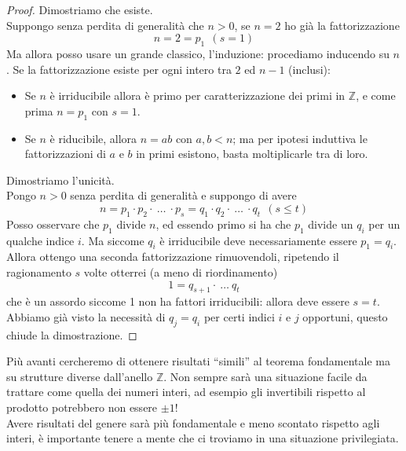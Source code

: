 \begin{proof} Dimostriamo che esiste. \\ Suppongo senza perdita di generalità che $n>0$, se $n=2$ ho già la fattorizzazione
	\begin{equation*}
	n = 2 = p_1 \ \ (s=1)
	\end{equation*}
	Ma allora posso usare un grande classico, l'induzione: procediamo inducendo su $n$. Se la fattorizzazione esiste per ogni intero tra $2$ ed $n-1$ (inclusi):
	\begin{itemize}
		\item Se $n$ è irriducibile allora è primo per caratterizzazione dei primi in $\mathbb{Z}$, e come prima $n=p_1$ con $s=1$.
		\item Se $n$ è riducibile, allora $n=ab$ con $a,b<n$; ma per ipotesi induttiva le fattorizzazioni di $a$ e $b$ in primi esistono, basta moltiplicarle tra di loro.
	\end{itemize}
	Dimostriamo l'unicità. \\ Pongo $n>0$ senza perdita di generalità e suppongo di avere
	\begin{equation*}
	 n= p_1\cdot p_2 \cdot \ \dots\ \cdot p_s= q_1\cdot q_2 \cdot \ \dots\ \cdot q_t \ \ (s \leq t)
	\end{equation*}
	Posso osservare che $p_1$ divide $n$, ed essendo primo si ha che $p_1$ divide un $q_i$ per un qualche indice $i$. Ma siccome $q_i$ è irriducibile deve necessariamente essere $p_1=q_i$. Allora ottengo una seconda fattorizzazione rimuovendoli, ripetendo il ragionamento $s$ volte otterrei (a meno di riordinamento)
	\begin{equation*}
	1 = q_{s+1}\cdot \ \dots \ q_t
	\end{equation*}
	che è un assordo siccome 1 non ha fattori irriducibili: allora deve essere $s=t$. \\ Abbiamo già visto la necessità di $q_j = q_i$ per certi indici $i$ e $j$ opportuni, questo chiude la dimostrazione.
\end{proof}
Più avanti cercheremo di ottenere risultati \enquote{simili} al teorema fondamentale ma su strutture diverse dall'anello $\mathbb{Z}$. Non sempre sarà una situazione facile da trattare come quella dei numeri interi, ad esempio gli invertibili rispetto al prodotto potrebbero non essere $\pm 1$! \\ Avere risultati del genere sarà più fondamentale e meno scontato rispetto agli interi, è importante tenere a mente che ci troviamo in una situazione privilegiata.




